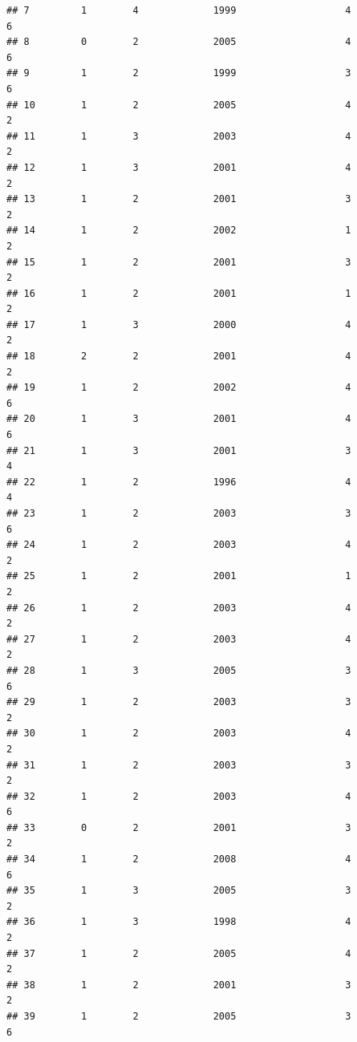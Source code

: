 \documentclass[
]{article}
\begin{document}
\begin{verbatim}
## 7         1        4             1999                   4                 6
## 8         0        2             2005                   4                 6
## 9         1        2             1999                   3                 6
## 10        1        2             2005                   4                 2
## 11        1        3             2003                   4                 2
## 12        1        3             2001                   4                 2
## 13        1        2             2001                   3                 2
## 14        1        2             2002                   1                 2
## 15        1        2             2001                   3                 2
## 16        1        2             2001                   1                 2
## 17        1        3             2000                   4                 2
## 18        2        2             2001                   4                 2
## 19        1        2             2002                   4                 6
## 20        1        3             2001                   4                 6
## 21        1        3             2001                   3                 4
## 22        1        2             1996                   4                 4
## 23        1        2             2003                   3                 6
## 24        1        2             2003                   4                 2
## 25        1        2             2001                   1                 2
## 26        1        2             2003                   4                 2
## 27        1        2             2003                   4                 2
## 28        1        3             2005                   3                 6
## 29        1        2             2003                   3                 2
## 30        1        2             2003                   4                 2
## 31        1        2             2003                   3                 2
## 32        1        2             2003                   4                 6
## 33        0        2             2001                   3                 2
## 34        1        2             2008                   4                 6
## 35        1        3             2005                   3                 2
## 36        1        3             1998                   4                 2
## 37        1        2             2005                   4                 2
## 38        1        2             2001                   3                 2
## 39        1        2             2005                   3                 6

\end{verbatim}
\end{document}
